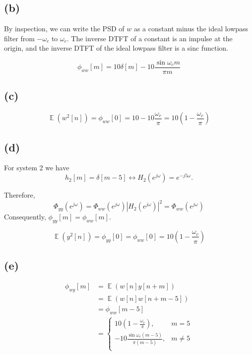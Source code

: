 \documentclass{article}
\DeclareMathOperator{\E}{\mathbb{E}}
\begin{document}
\subsection{(b)}

By inspection, we can write the PSD of $w$ as a constant minus the ideal lowpass filter from $-\omega_c$ to $\omega_c$. The inverse DTFT of a constant is an impulse at the origin, and the inverse DTFT of the ideal lowpass filter is a sinc function.

\begin{equation}
\phi_{ww}[m] = 10\delta[m] - 10\frac{\sin\omega_cm}{\pi m}
\end{equation}
	
\subsection{(c)}
\begin{equation}
\E(w^2[n]) = \phi_{ww}[0] = 10 - 10\frac{\omega_c}{\pi} = 10(1 - \frac{\omega_c}{\pi})
\end{equation}
	
\subsection{(d)}

For system 2 we have
\begin{equation}
h_2[m] = \delta[m-5] \longleftrightarrow H_2(e^{j\omega}) = e^{-j5\omega}.
\end{equation}

Therefore,
\begin{equation}
\Phi_{yy}(e^{j\omega}) = \Phi_{ww}(e^{j\omega})|H_2(e^{j\omega})|^2 = \Phi_{ww}(e^{j\omega})
\end{equation}
Consequently, $\phi_{yy}[m] = \phi_{ww}[m]$.

\begin{equation}
\E(y^2[n]) = \phi_{yy}[0] =  \phi_{ww}[0] = 10(1 - \frac{\omega_c}{\pi})
\end{equation}

\subsection{(e)}
\begin{align}\nonumber
\phi_{wy}[m] &= \E(w[n]y[n+m]) \\ 
&= \E(w[n]w[n+m-5]) \\ \nonumber
&= \phi_{ww}[m-5] \\
&=\begin{cases}
10(1-\frac{\omega_c}{\pi}), & m = 5 \\
-10\frac{\sin\omega_c(m-5)}{\pi(m-5)}, & m \neq 5 \\
\end{cases}
\end{align}
	
\end{document}
